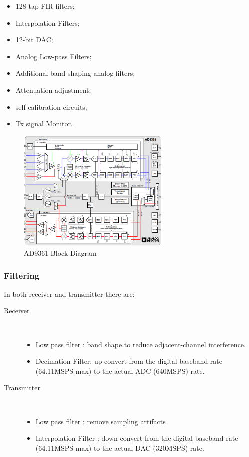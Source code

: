 \begin{itemize}
	\item 128-tap FIR filters;
	\item Interpolation Filters;
	\item 12-bit DAC;
	\item Analog Low-pass Filters;
	\item Additional band shaping analog filters;
	\item Attenuation adjustment;
	\item self-calibration circuits;
	\item Tx signal Monitor.
\end{itemize}

\begin{figure}[htbp]
    \centering
    \includegraphics[width=0.65\textwidth]{./figures/ad9361_block_diagram}
    \caption{ AD9361 Block Diagram
    \label{fig:ad9361blk}}
\end{figure}

\subsubsection{Filtering}

In both receiver and transmitter there are:
\begin{description}
	\item[Receiver] \hfill \\
	\begin{itemize}
		\item Low pass filter : band shape to reduce adjacent-channel interference.
		\item Decimation Filter: up convert from the digital baseband rate (64.11MSPS max) to the actual ADC (640MSPS) rate.
	\end{itemize}
	\item[Transmitter] \hfill \\
\begin{itemize}
		\item Low pass filter : remove sampling artifacts
		\item Interpolation Filter : down convert from the digital baseband rate (64.11MSPS max) to the actual DAC (320MSPS) rate.
	\end{itemize}
\end{description}

